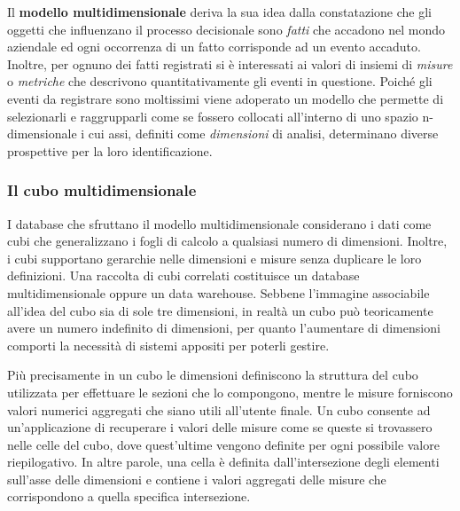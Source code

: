 Il \textbf{modello multidimensionale} deriva la sua idea dalla constatazione che gli oggetti che influenzano il processo decisionale sono \textit{fatti} che accadono nel mondo aziendale ed ogni occorrenza di un fatto corrisponde ad un evento accaduto. Inoltre, per ognuno dei fatti registrati si è interessati ai valori di insiemi di \textit{misure} o \textit{metriche} che descrivono quantitativamente gli eventi in questione. Poiché gli eventi da registrare sono moltissimi viene adoperato un modello che permette di selezionarli e raggrupparli come se fossero collocati all'interno di uno spazio n-dimensionale i cui assi, definiti come \textit{dimensioni} di analisi, determinano diverse prospettive per la loro identificazione.\cite{unibo_introduzione_al_data_warehousing}

\subsubsection{Il cubo multidimensionale}

I database che sfruttano il modello multidimensionale considerano i dati come cubi che generalizzano i fogli di calcolo a qualsiasi numero di dimensioni. Inoltre, i cubi supportano gerarchie nelle dimensioni e misure senza duplicare le loro definizioni. Una raccolta di cubi correlati costituisce un database multidimensionale oppure un data warehouse. Sebbene l'immagine associabile all'idea del cubo sia di sole tre dimensioni, in realtà un cubo può teoricamente avere un numero indefinito di dimensioni, per quanto l'aumentare di dimensioni comporti la necessità di sistemi appositi per poterli gestire.\cite{researchgate_multidimensional_db}

Più precisamente in un cubo le dimensioni definiscono la struttura del cubo utilizzata per effettuare le sezioni che lo compongono, mentre le misure forniscono valori numerici aggregati che siano utili all'utente finale. Un cubo consente ad un'applicazione di recuperare i valori delle misure come se queste si trovassero nelle celle del cubo, dove quest'ultime vengono definite per ogni possibile valore riepilogativo. In altre parole, una cella è definita dall'intersezione degli elementi sull'asse delle dimensioni e contiene i valori aggregati delle misure che corrispondono a quella specifica intersezione.\cite{microsoft_multidimensional_models}

